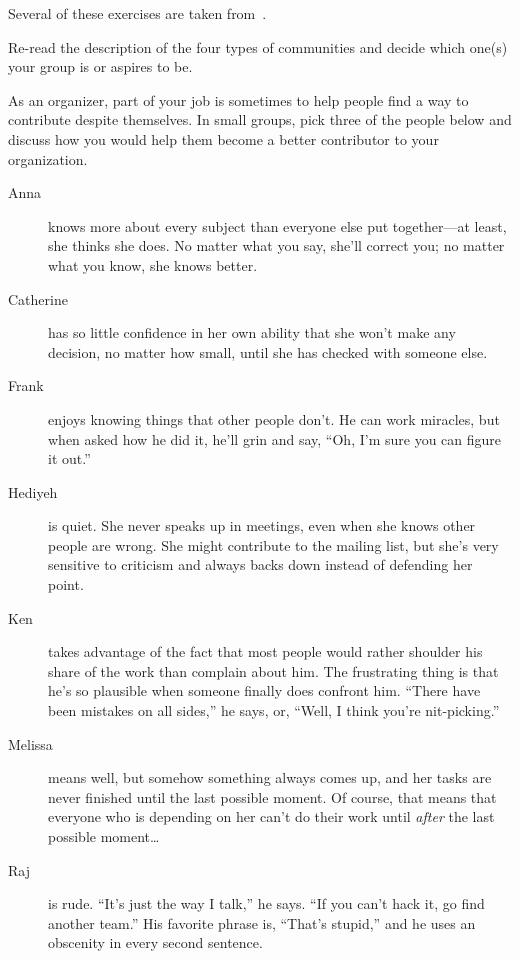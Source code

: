
Several of these exercises are taken from~\cite{Brow2007}.


Re-read the description of the four types of communities
and decide which one(s) your group is or aspires to be.


As an organizer,
part of your job is sometimes to help people find a way to contribute despite themselves.
In small groups,
pick three of the people below
and discuss how you would help them become a better contributor to your organization.

\begin{description}

\item[Anna]
  knows more about every subject than everyone else put together---at least,
  she thinks she does.
  No matter what you say,
  she'll correct you;
  no matter what you know, she knows better.

\item[Catherine]
  has so little confidence in her own ability
  that she won't make any decision,
  no matter how small,
  until she has checked with someone else.

\item[Frank]
  enjoys knowing things that other people don't.
  He can work miracles,
  but when asked how he did it,
  he'll grin and say,
  ``Oh, I'm sure you can figure it out.''

\item[Hediyeh]
  is quiet.
  She never speaks up in meetings,
  even when she knows other people are wrong.
  She might contribute to the mailing list,
  but she's very sensitive to criticism
  and always backs down instead of defending her point.

\item[Ken]
  takes advantage of the fact that most people would rather shoulder his share of the work
  than complain about him.
  The frustrating thing is that he's so plausible when someone finally does confront him.
  ``There have been mistakes on all sides,''
  he says,
  or, ``Well, I think you're nit-picking.''

\item[Melissa]
  means well,
  but somehow something always comes up,
  and her tasks are never finished until the last possible moment.
  Of course,
  that means that everyone who is depending on her can't do their work
  until \emph{after} the last possible moment{\ldots}

\item[Raj]
  is rude.
  ``It's just the way I talk,'' he says.
  ``If you can't hack it, go find another team.''
  His favorite phrase is, ``That's stupid,''
  and he uses an obscenity in every second sentence.

\end{description}


